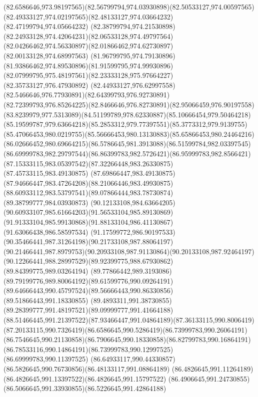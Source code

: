 {{\curveto(82.6586646,973.98197565)(82.56799794,974.03930898)(82.50533127,974.00597565)
\curveto(82.49333127,974.02197565)(82.48133127,974.03664232)(82.47199794,974.05664232)
\curveto(82.38799794,974.21530898)(82.24933128,974.42064231)(82.06533128,974.49797564)
\curveto(82.04266462,974.56330897)(82.01866462,974.62730897)(82.00133128,974.68997563)
\curveto(81.96799795,974.79130896)(81.93866462,974.89530896)(81.91599795,974.99930896)
\curveto(82.07999795,975.48197561)(82.23333128,975.97664227)(82.35733127,976.47930892)
\curveto(82.44933127,976.62997558)(82.5466646,976.77930891)(82.64399793,976.92730891)
\curveto(82.72399793,976.85264225)(82.8466646,976.82730891)(82.95066459,976.90197558)
\curveto(83.8239979,977.5313089)(84.51199789,978.62330887)(85.10666454,979.50464218)
\curveto(85.19599787,979.63664218)(85.2853312,979.77397551)(85.3773312,979.9139755)
\curveto(85.47066453,980.0219755)(85.56666453,980.13130883)(85.65866453,980.24464216)
\curveto(86.02666452,980.69664215)(86.5786645,981.3913088)(86.51599784,982.03397545)
\curveto(86.69999783,982.29797544)(86.86399783,982.5726421)(86.95999783,982.8566421)
\curveto(87.15333115,983.05397542)(87.32266448,983.26330875)(87.45733115,983.49130875)
\curveto(87.69866447,983.49130875)(87.94666447,983.47264208)(88.21066446,983.49930875)
\curveto(88.60933112,983.53797541)(89.07866444,983.78730874)(89.38799777,984.03930873)
\curveto(90.12133108,984.63664205)(90.60933107,985.61664203)(91.56533104,985.89130869)
\curveto(91.91333104,985.99130868)(91.88133104,986.41130867)(91.63066438,986.58597534)
\curveto(91.17599772,986.90197533)(90.35466441,987.31264198)(90.21733108,987.88064197)
\curveto(90.21466441,987.8979753)(90.20933108,987.91130864)(90.20133108,987.92464197)
\curveto(90.12266441,988.28997529)(89.92399775,988.67930862)(89.84399775,989.03264194)
\curveto(89.77866442,989.3193086)(89.79199776,989.80064192)(89.61599776,990.09264191)
\curveto(89.64666443,990.45797524)(89.56666443,990.86330856)(89.51866443,991.18330855)
\curveto(89.4893311,991.38730855)(89.28399777,991.48197521)(89.09999777,991.41664188)
\curveto(88.51466445,991.21397522)(87.93466447,991.04864189)(87.36133115,990.8006419)
\curveto(87.20133115,990.7326419)(86.6586645,990.5286419)(86.73999783,990.26064191)
\curveto(86.7546645,990.21130858)(86.7906645,990.18330858)(86.82799783,990.16864191)
\curveto(86.78533116,990.14864191)(86.73999783,990.12997525)(86.69999783,990.11397525)
\curveto(86.64933117,990.44330857)(86.5826645,990.76730856)(86.48133117,991.08864189)
\curveto(86.4826645,991.11264189)(86.4826645,991.13397522)(86.4826645,991.15797522)
\curveto(86.4906645,991.24730855)(86.5066645,991.33930855)(86.5226645,991.42864188)
}}
